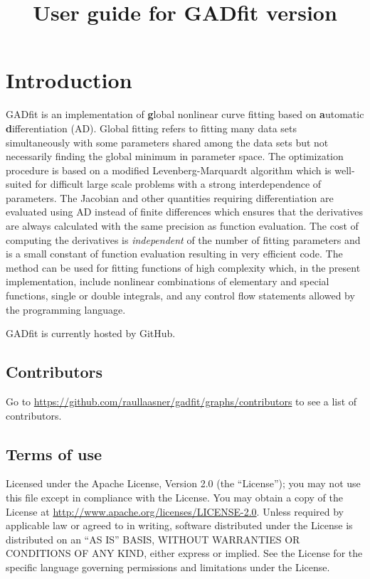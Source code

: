 \documentclass{article}
\title{User guide for GADfit version \version}
\date{\monthname {} \the\year}
\begin{document}
\maketitle
\tableofcontents

\section{Introduction}

GADfit is an implementation of \textbf{g}lobal nonlinear curve fitting based on \textbf{a}utomatic \textbf{d}ifferentiation (AD). Global fitting refers to fitting many data sets simultaneously with some parameters shared among the data sets but not necessarily finding the global minimum in parameter space. The optimization procedure is based on a modified Levenberg-Marquardt algorithm which is well-suited for difficult large scale problems with a strong interdependence of parameters. The Jacobian and other quantities requiring differentiation are evaluated using AD instead of finite differences which ensures that the derivatives are always calculated with the same precision as function evaluation. The cost of computing the derivatives is \textit{independent} of the number of fitting parameters and is a small constant of function evaluation resulting in very efficient code. The method can be used for fitting functions of high complexity which, in the present implementation, include nonlinear combinations of elementary and special functions, single or double integrals, and any control flow statements allowed by the programming language.

GADfit is currently hosted by GitHub.

\subsection{Contributors}

Go to \url{https://github.com/raullaasner/gadfit/graphs/contributors} to see a list of contributors.

\subsection{Terms of use}

Licensed under the Apache License, Version 2.0 (the ``License''); you may not use this file except in compliance with the License. You may obtain a copy of the License at \url{http://www.apache.org/licenses/LICENSE-2.0}. Unless required by applicable law or agreed to in writing, software distributed under the License is distributed on an ``AS IS'' BASIS, WITHOUT WARRANTIES OR CONDITIONS OF ANY KIND, either express or implied. See the License for the specific language governing permissions and limitations under the License.
\end{document}

